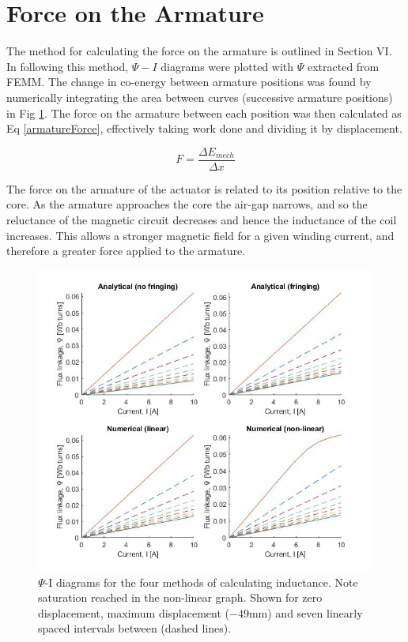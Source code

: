 \documentclass[a4paper]{IEEEtran}
\begin{document}
\section{Force on the Armature}

    The method for calculating the force on the armature is outlined in \cite{labPartB} Section VI. In following this method, \(\Psi-I\) diagrams were plotted with \(\Psi\) extracted from FEMM. The change in co-energy between armature positions was found by numerically integrating the area between curves (successive armature positions) in Fig \ref{psi-eye}. The force on the armature between each position was then calculated as Eq \ref{armatureForce}, effectively taking work done and dividing it by displacement.

    \begin{equation}
        F = \frac{\Delta E_{mech}}{\Delta x}
        \label{armatureForce}
    \end{equation}

    The force on the armature of the actuator is related to its position relative to the core. As the armature approaches the core the air-gap narrows, and so the reluctance of the magnetic circuit decreases and hence the inductance of the coil increases. This allows a stronger magnetic field for a given winding current, and therefore a greater force applied to the armature. 



    \begin{figure}[ht]
        \includegraphics[width = \linewidth]{psi-I-diagrams.jpg}
        \caption{$\Psi$-I diagrams for the four methods of calculating inductance. Note saturation reached in the non-linear graph. Shown for zero displacement, maximum displacement ($-49$mm) and seven linearly spaced intervals between (dashed lines).}
        \label{psi-eye} 
    \end{figure}
\end{document}
